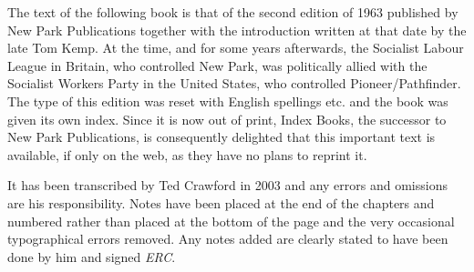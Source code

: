 The text of the following book is that of the second edition of 1963 published by New Park Publications together with the introduction written at that date by the late Tom Kemp. At the time, and for some years afterwards, the Socialist Labour League in Britain, who controlled New Park, was politically allied with the Socialist Workers Party in the United States, who controlled Pioneer/Pathfinder. The type of this edition was reset with English spellings etc. and the book was given its own index. Since it is now out of print, Index Books, the successor to New Park Publications, is consequently delighted that this important text is available, if only on the web, as they have no plans to reprint it.

It has been transcribed by Ted Crawford in 2003 and any errors and omissions are his responsibility. Notes have been placed at the end of the chapters and numbered rather than placed at the bottom of the page and the very occasional typographical errors removed. Any notes added are clearly stated to have been done by him and signed \emph{ERC}.